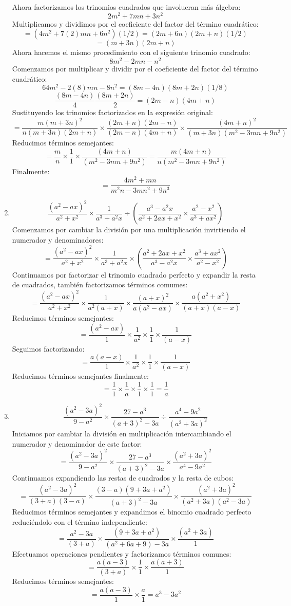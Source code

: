 \documentclass[12pt]{article}
\begin{document}
\begin{enumerate}[label=\bfseries Ejercicio \arabic*:]
Ahora factorizamos los trinomios cuadrados que involucran más álgebra:
$$2m^2 + 7mn + 3n^2$$
Multiplicamos y dividimos por el coeficiente del factor del término cuadrático:
$$= (4m^2 + 7(2)mn + 6n^2)(1/2) = (2m + 6n)(2m + n)(1/2)$$
$$= (m + 3n)(2m + n)$$
Ahora hacemos el mismo procedimiento con el siguiente trinomio cuadrado:
$$8m^2 - 2mn - n^2$$
Comenzamos por multiplicar y dividir por el coeficiente del factor del término cuadrático:
$$64m^2 - 2(8)mn - 8n^2 = (8m - 4n)(8m + 2n)(1/8)$$
$$\frac{(8m - 4n)}{4} \frac{(8m + 2n)}{2} = (2m - n)(4m + n)$$
Sustituyendo los trinomios factorizados en la expresión original:
$$= \frac{m(m + 3n)^2}{n(m + 3n)(2m + n)} \times \frac{(2m + n)(2m - n)}{(2m - n)(4m + n)} \times \frac{(4m + n)^2}{(m + 3n)(m^2 - 3mn + 9n^2)}$$
Reducimos términos semejantes:
$$= \frac{m}{n} \times \frac{1}{1} \times \frac{(4m + n)}{(m^2 - 3mn + 9n^2)} = \frac{m(4m + n)}{n(m^2 - 3mn + 9n^2)}$$
Finalmente:
$$= \frac{4m^2 + mn}{m^2n - 3mn^2 + 9n^3}$$
  \item $$\frac{(a^2 - ax)^2}{a^2 + x^2} \times \frac{1}{a^3 + a^2x} \div \left( \frac{a^3 - a^2x}{a^2 + 2ax + x^2} \times \frac{a^2 - x^2}{a^3 + ax^2} \right)$$
Comenzamos por cambiar la división por una multiplicación invirtiendo el numerador y denominadores:
$$= \frac{(a^2 - ax)^2}{a^2 + x^2} \times \frac{1}{a^3 + a^2x} \times \left( \frac{a^2 + 2ax + x^2}{a^3 - a^2x} \times \frac{a^3 + ax^2}{a^2 - x^2} \right)$$
Continuamos por factorizar el trinomio cuadrado perfecto y expandir la resta de cuadrados, también factorizamos términos comumes:
$$= \frac{(a^2 - ax)^2}{a^2 + x^2} \times \frac{1}{a^2(a + x)} \times \frac{(a + x)^2}{a(a^2 - ax)} \times \frac{a(a^2 + x^2)}{(a + x)(a - x)}$$
Reducimos términos semejantes:
$$= \frac{(a^2 - ax)}{1} \times \frac{1}{a^2} \times \frac{1}{1} \times \frac{1}{(a - x)}$$
Seguimos factorizando:
$$= \frac{a(a - x)}{1} \times \frac{1}{a^2} \times \frac{1}{1} \times \frac{1}{(a - x)}$$
Reducimos términos semejantes finalmente:
$$= \frac{1}{1} \times \frac{1}{a} \times \frac{1}{1} \times \frac{1}{1} = \frac{1}{a}$$
  \item $$\frac{(a^2 - 3a)^2}{9 - a^2} \times \frac{27 - a^3}{(a + 3)^2 - 3a} \div \frac{a^4 - 9a^2}{(a^2 + 3a)^2}$$
Iniciamos por cambiar la división en multiplicación intercambiando el numerador y denominador de este factor:
$$= \frac{(a^2 - 3a)^2}{9 - a^2} \times \frac{27 - a^3}{(a + 3)^2 - 3a} \times \frac{(a^2 + 3a)^2}{a^4 - 9a^2}$$
Continuamos expandiendo las restas de cuadrados y la resta de cubos:
$$= \frac{(a^2 - 3a)^2}{(3 + a)(3 - a)} \times \frac{(3 - a)(9 +3a + a^2)}{(a + 3)^2 - 3a} \times \frac{(a^2 + 3a)^2}{(a^2 + 3a)(a^2 - 3a)}$$
Reducimos términos semejantes y expandimos el binomio cuadrado perfecto reduciéndolo con el término independiente:
$$= \frac{a^2 - 3a}{(3 + a)} \times \frac{(9 +3a + a^2)}{(a^2 +6a + 9) - 3a} \times \frac{(a^2 + 3a)}{1}$$
Efectuamos operaciones pendientes y factorizamos términos comunes:
$$= \frac{a(a - 3)}{(3 + a)} \times \frac{1}{1} \times \frac{a(a + 3)}{1}$$
Reducimos términos semejantes:
$$= \frac{a(a - 3)}{1} \times \frac{a}{1} = a^3 - 3a^2$$
\end{enumerate}
\end{document}
